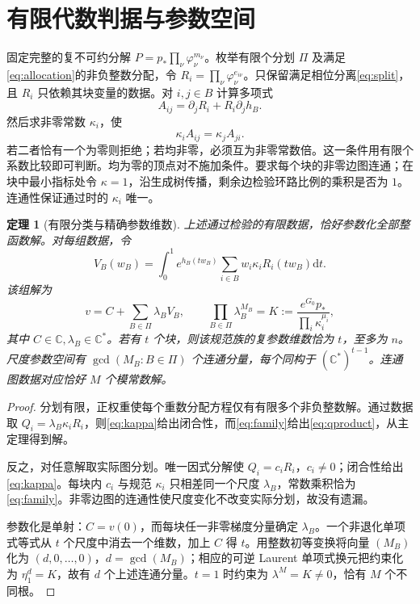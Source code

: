 \documentclass[UTF8,11pt,a4paper,fontset=fandol]{ctexart}
\newtheorem{theorem}{定理}[section]
\theoremstyle{definition}\newtheorem{definition}[theorem]{定义}
\theoremstyle{remark}\newtheorem{remark}[theorem]{注}
\newcommand{\C}{\mathbb C}\newcommand{\N}{\mathbb N}
\newcommand{\dd}{\mathrm d}\newcommand{\OO}{\mathcal O}
\begin{document}
\section{有限代数判据与参数空间}\label{sec:finite}
固定完整的复不可约分解 $P=p_*\prod_\nu\varphi_\nu^{m_\nu}$。枚举有限个分划 $\Pi$ 及满足\eqref{eq:allocation}的非负整数分配，令 $R_i=\prod_\nu\varphi_\nu^{e_{i\nu}}$。只保留满足相位分离\eqref{eq:split}，且 $R_i$ 只依赖其块变量的数据。对 $i,j\in B$ 计算多项式
\[
A_{ij}=\partial_jR_i+R_i\partial_jh_B.
\]
然后求非零常数 $\kappa_i$，使
\begin{equation}\label{eq:kappa}
\kappa_iA_{ij}=\kappa_jA_{ji}.
\end{equation}
若二者恰有一个为零则拒绝；若均非零，必须互为非零常数倍。这一条件用有限个系数比较即可判断。均为零的顶点对不施加条件。要求每个块的非零边图连通；在块中最小指标处令 $\kappa=1$，沿生成树传播，剩余边检验环路比例的乘积是否为 $1$。连通性保证通过时的 $\kappa_i$ 唯一。

\begin{theorem}[有限分类与精确参数维数]\label{thm:finite}
上述通过检验的有限数据，恰好参数化全部整函数解。对每组数据，令
\[
V_B(w_B)=\int_0^1e^{h_B(tw_B)}\sum_{i\in B}w_i\kappa_iR_i(tw_B)\dd t.
\]
该组解为
\begin{equation}\label{eq:family}
v=C+\sum_{B\in\Pi}\lambda_BV_B,\qquad
\prod_{B\in\Pi}\lambda_B^{M_B}
=K:=\frac{e^{G_0}p_*}{\prod_i\kappa_i^{\mu_i}},
\end{equation}
其中 $C\in\C,\lambda_B\in\C^*$。若有 $t$ 个块，则该规范族的复参数维数恰为 $t$，至多为 $n$。尺度参数空间有 $\gcd(M_B:B\in\Pi)$ 个连通分量，每个同构于 $(\C^*)^{t-1}$。连通图数据对应恰好 $M$ 个模常数解。
\end{theorem}
\begin{proof}
分划有限，正权重使每个重数分配方程仅有有限多个非负整数解。通过数据取 $Q_i=\lambda_B\kappa_iR_i$，则\eqref{eq:kappa}给出闭合性，而\eqref{eq:family}给出\eqref{eq:qproduct}，从主定理得到解。

反之，对任意解取实际图分划。唯一因式分解使 $Q_i=c_iR_i$，$c_i\ne0$；闭合性给出\eqref{eq:kappa}。每块内 $c_i$ 与规范 $\kappa_i$ 只相差同一个尺度 $\lambda_B$，常数乘积恰为\eqref{eq:family}。非零边图的连通性使尺度变化不改变实际分划，故没有遗漏。

参数化是单射：$C=v(0)$，而每块任一非零梯度分量确定 $\lambda_B$。一个非退化单项式等式从 $t$ 个尺度中消去一个维数，加上 $C$ 得 $t$。用整数初等变换将向量 $(M_B)$ 化为 $(d,0,\ldots,0)$，$d=\gcd(M_B)$；相应的可逆 Laurent 单项式换元把约束化为 $\eta_1^d=K$，故有 $d$ 个上述连通分量。$t=1$ 时约束为 $\lambda^M=K\ne0$，恰有 $M$ 个不同根。
\end{proof}
\end{document}
